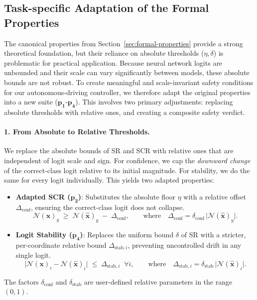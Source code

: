 \subsection{Task-specific Adaptation of the Formal Properties}
\label{sec:task-adaptation}

The canonical properties from Section~\ref{sec:formal-properties} provide a strong theoretical foundation, but their reliance on absolute thresholds (\(\eta, \delta\)) is problematic for practical application. Because neural network logits are unbounded and their scale can vary significantly between models, these absolute bounds are not robust. To create meaningful and scale-invariant safety conditions for our autonomous-driving controller, we therefore adapt the original properties into a new suite (\(\mathbf{p_1}\)-\(\mathbf{p_4}\)). This involves two primary adjustments: replacing absolute thresholds with relative ones, and creating a composite safety verdict.

\paragraph{1. From Absolute to Relative Thresholds.}
We replace the absolute bounds of SR and SCR with relative ones that are independent of logit scale and sign. For confidence, we cap the \emph{downward change} of the correct-class logit relative to its initial magnitude. For stability, we do the same for every logit individually. This yields two adapted properties:

\begin{itemize}
    \item \textbf{Adapted SCR (\(\mathbf{p_2}\))}: Substitutes the absolute floor \(\eta\) with a relative offset $\Delta_{\text{conf}}$, ensuring the correct-class logit does not collapse.
    \[
        \mathcal{N}(\boldsymbol{x})_{y}
        \;\ge\;
        \mathcal{N}(\boldsymbol{\hat{x}})_{y}
        \;-\;
        \Delta_{\text{conf}},
        \qquad\text{where}\quad
        \Delta_{\text{conf}}
            = \delta_{\text{conf}}\,
              \bigl|\mathcal{N}(\boldsymbol{\hat{x}})_{y}\bigr|.
    \]
    \item \textbf{Logit Stability (\(\mathbf{p_4}\))}: Replaces the uniform bound \(\delta\) of SR with a stricter, per-coordinate relative bound $\Delta_{\text{stab},i}$, preventing uncontrolled drift in any single logit.
    \[
        \bigl|
           \mathcal{N}(\boldsymbol{x})_{i}
           -\mathcal{N}(\boldsymbol{\hat{x}})_{i}
        \bigr|
        \;\le\;
        \Delta_{\text{stab}, i}
        \;\;\forall i,
        \qquad\text{where}\quad
        \Delta_{\text{stab}, i}
            = \delta_{\text{stab}}\,
              \bigl|\mathcal{N}(\boldsymbol{\hat{x}})_{i}\bigr|.
    \]
\end{itemize}
The factors \(\delta_{\text{conf}}\) and \(\delta_{\text{stab}}\) are user-defined relative parameters in the range \((0,1)\).

